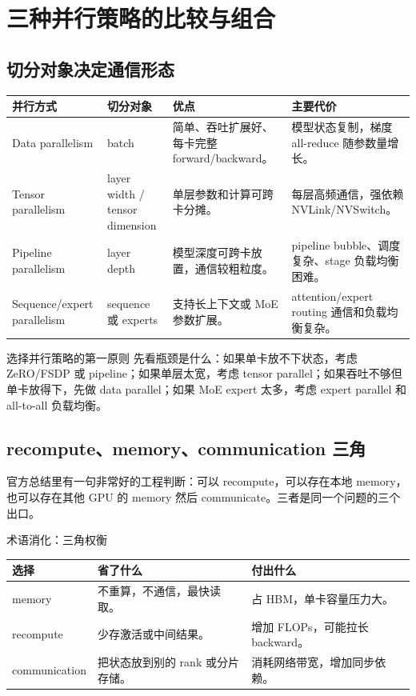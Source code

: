 \section{三种并行策略的比较与组合}

\subsection{切分对象决定通信形态}

\begin{longtable}{L{0.18\textwidth}L{0.16\textwidth}L{0.25\textwidth}L{0.25\textwidth}}
\toprule
并行方式 & 切分对象 & 优点 & 主要代价 \\
\midrule
\endhead
Data parallelism & batch & 简单、吞吐扩展好、每卡完整 forward/backward。 & 模型状态复制，梯度 all-reduce 随参数量增长。 \\
Tensor parallelism & layer width / tensor dimension & 单层参数和计算可跨卡分摊。 & 每层高频通信，强依赖 NVLink/NVSwitch。 \\
Pipeline parallelism & layer depth & 模型深度可跨卡放置，通信较粗粒度。 & pipeline bubble、调度复杂、stage 负载均衡困难。 \\
Sequence/expert parallelism & sequence 或 experts & 支持长上下文或 MoE 参数扩展。 & attention/expert routing 通信和负载均衡复杂。 \\
\bottomrule
\end{longtable}

\begin{importantbox}{选择并行策略的第一原则}
先看瓶颈是什么：如果单卡放不下状态，考虑 ZeRO/FSDP 或 pipeline；如果单层太宽，考虑 tensor parallel；如果吞吐不够但单卡放得下，先做 data parallel；如果 MoE expert 太多，考虑 expert parallel 和 all-to-all 负载均衡。
\end{importantbox}

\subsection{recompute、memory、communication 三角}

官方总结里有一句非常好的工程判断：可以 recompute，可以存在本地 memory，也可以存在其他 GPU 的 memory 然后 communicate。三者是同一个问题的三个出口。

\begin{knowledgebox}{术语消化：三角权衡}
\begin{tabular}{L{0.2\textwidth}L{0.35\textwidth}L{0.35\textwidth}}
\toprule
选择 & 省了什么 & 付出什么 \\
\midrule
memory & 不重算，不通信，最快读取。 & 占 HBM，单卡容量压力大。 \\
recompute & 少存激活或中间结果。 & 增加 FLOPs，可能拉长 backward。 \\
communication & 把状态放到别的 rank 或分片存储。 & 消耗网络带宽，增加同步依赖。 \\
\bottomrule
\end{tabular}
\end{knowledgebox}

